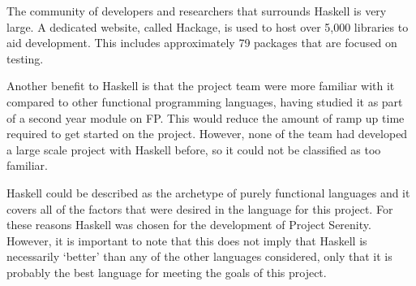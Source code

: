 The community of developers and researchers that surrounds Haskell is very large. A dedicated website, called Hackage, is used to host over 5,000 libraries to aid development. This includes approximately 79 packages that are focused on testing.

Another benefit to Haskell is that the project team were more familiar with it compared to other functional programming languages, having studied it as part of a second year module on FP. This would reduce the amount of ramp up time required to get started on the project. However, none of the team had developed a large scale project with Haskell before, so it could not be classified as too familiar.

Haskell could be described as the archetype of purely functional languages and it covers all of the factors that were desired in the language for this project. For these reasons Haskell was chosen for the development of Project Serenity. However, it is important to note that this does not imply that Haskell is necessarily `better' than any of the other languages considered, only that it is probably the best language for meeting the goals of this project.
